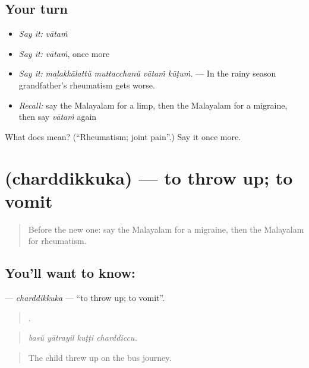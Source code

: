 \subsection*{Your turn}
\begin{itemize}
\raggedright
  \item \emph{Say it:} \emph{vātaṁ}
  \item \emph{Say it:} \emph{vātaṁ}, once more
  \item \emph{Say it:} \emph{maḻakkālattŭ muttacchanŭ vātaṁ kūṭuṁ.} — In the rainy season grandfather's rheumatism gets worse.
  \item \emph{Recall:} say the Malayalam for a limp, then the Malayalam for a migraine, then say \emph{vātaṁ} again
\end{itemize}

\begin{tcolorbox}[breakable,colback=teal!4,colframe=teal!35!black,title={Before you move on}]
What does  mean? (\textquotedblleft{}Rheumatism; joint pain\textquotedblright{}.) Say it once more.
\end{tcolorbox}
\section[\texorpdfstring{\ml{ഛർദ്ദിക്കുക} (charddikkuka)}{ഛർദ്ദിക്കുക (charddikkuka)}]{ (charddikkuka) — to throw up; to vomit}

\label{lesson:ML-C535-charddikkuka}



\begin{quote}
Before the new one: say the Malayalam for a migraine, then the Malayalam for rheumatism.
\end{quote}

\subsection*{You'll want to know: }
\textbf{} — \emph{charddikkuka} — \textquotedblleft{}to throw up; to vomit\textquotedblright{}.

\begin{quote}
   .
\end{quote}

\begin{quote}
\emph{basŭ yātrayil kuṭṭi charddiccu.}
\end{quote}

\begin{quote}
The child threw up on the bus journey.
\end{quote}

